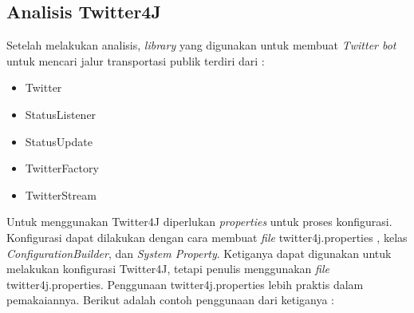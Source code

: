 \subsection{Analisis Twitter4J}
Setelah melakukan analisis, \textit{library} yang digunakan untuk membuat \textit{Twitter bot} untuk mencari jalur transportasi publik terdiri dari :
\begin{itemize}
	\item Twitter
	\item StatusListener
	\item StatusUpdate
	\item TwitterFactory
	\item TwitterStream
\end{itemize}

Untuk menggunakan Twitter4J diperlukan \textit{properties} untuk proses konfigurasi. Konfigurasi dapat dilakukan dengan cara membuat \textit{file} twitter4j.properties , kelas \textit{ConfigurationBuilder}, dan \textit{System Property}. Ketiganya dapat digunakan untuk melakukan konfigurasi Twitter4J, tetapi penulis menggunakan \textit{file} twitter4j.properties. Penggunaan twitter4j.properties lebih praktis dalam pemakaiannya. Berikut adalah contoh penggunaan dari ketiganya :


